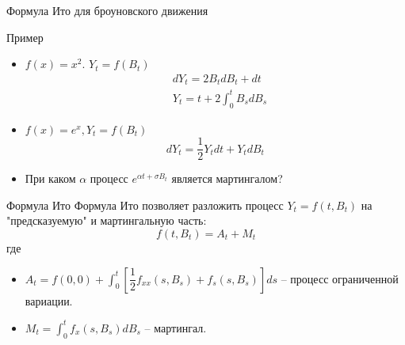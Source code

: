 \documentclass{beamer}
\begin{document}
\begin{frame}{Формула Ито для броуновского движения}
     
\end{frame}

\begin{frame}{Пример}

\begin{itemize}
    \item $f(x) =x^2$. $Y_t = f(B_t)$
    \begin{align*}
        &dY_t = 2 B_t dB_t + dt  \\
        &Y_t = t + 2 \int_0^t B_s dB_s
    \end{align*}
    \item $f(x) = e^{x}, Y_t = f(B_t)$
    $$
        dY_t = \dfrac{1}{2}Y_t dt + Y_t dB_t
    $$
    \item При каком $\alpha$ процесс $e^{\alpha t + \sigma B_t}$ является мартингалом? 
\end{itemize}
\end{frame}

\begin{frame}{Формула Ито}
Формула Ито позволяет разложить процесс $Y_t = f(t, B_t)$ на "предсказуемую" и мартингальную часть:
$$
    f(t, B_t) = A_t + M_t
$$где 
\begin{itemize}
    \item $A_t = f(0, 0) + \int_0^t \left[\dfrac{1}{2}f_{xx}(s, B_s) + f_s(s, B_s)\right] ds$ -- процесс ограниченной вариации.
    \item $M_t = \int_0^t f_x(s, B_s) dB_s$ -- мартингал.
\end{itemize}
\end{frame}
\end{document}
